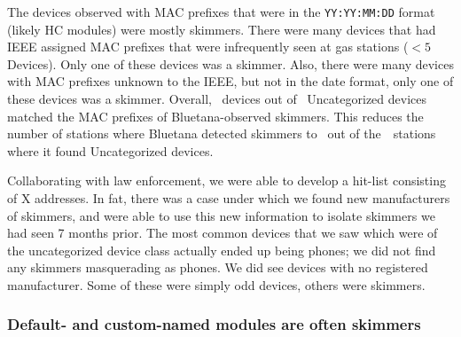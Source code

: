 The devices observed with MAC prefixes that were in the \texttt{YY:YY:MM:DD}
format (likely HC modules) were mostly skimmers.
%
There were many devices that had IEEE assigned MAC prefixes that were
infrequently seen at gas stations ($<5$ Devices). Only one of these devices
was a skimmer.
%
Also, there were many devices with MAC prefixes unknown to the IEEE, but not in
the date format, only one of these devices was a skimmer.
%
Overall, \numberBTMACCoDfiltered~devices out of
\numberbtuncategorized~Uncategorized devices matched the MAC prefixes of
Bluetana-observed skimmers.
%
This reduces the number of stations where Bluetana detected skimmers to
\visitedstationsMACCoDfiltered~out of the~\totaluncatstation~stations where it found
Uncategorized devices.

%
%
%
%
%

Collaborating with law
enforcement, we were able to develop a hit-list consisting of X addresses. In
fat, there was a case under which we found new manufacturers of skimmers, and
were able to use this new information to isolate skimmers we had seen 7 months
prior. The most common devices that we saw which were of the uncategorized
device class actually ended up being phones; we did not find any skimmers
masquerading as phones. We did see devices with no registered manufacturer. Some
of these were simply odd devices, others were skimmers.
\fi

\subsubsection*{Default- and custom-named modules are often skimmers} %

